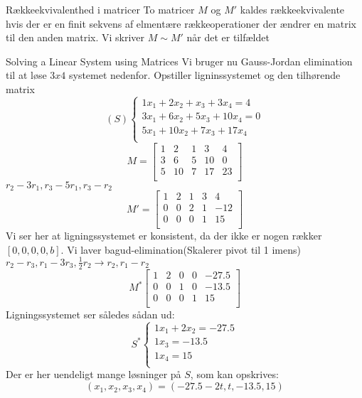 \documentclass[a4paper,fleqn]{article}
\begin{document}
	\begin{definition}{Rækkeekvivalenthed i matricer}{}
		To matricer $M$ og $M'$ kaldes rækkeekvivalente hvis der er en finit sekvens af
		elmentære rækkeoperationer der ændrer en matrix til den anden matrix. Vi skriver
		$M \sim M'$ når det er tilfældet
	\end{definition}
	\begin{example}{Solving a Linear System using Matrices}{}
		Vi bruger nu Gauss-Jordan elimination til at løse $3x4$ systemet nedenfor.
		Opstiller ligninssystemet og den tilhørende matrix\\
		\[
			(S)\left\{\begin{array}{c}
					1x_1+2x_2+x_3+3x_4=4\\
					3x_1+6x_2+5x_3+10x_4=0\\
					5x_1+10x_2+7x_3+17x_4\\
			\end{array}\right.
		\]\[
			M = \begin{bmatrix}
				1&2&1&3& 4\\
				3&6&5&10&0\\
				5&10&7&17&23\\
	\end{bmatrix}\]$r_2-3r_1,r_3-5r_1, r_3-r_2$ \[
	M' = \begin{bmatrix}
		1&2&1&3&4\\
		0&0&2&1&-12\\
		0&0&0&1&15\\
	\end{bmatrix}\]
	Vi ser her at ligningssystemet er konsistent, da der ikke er nogen rækker 
	$[ 0, 0, 0, 0, b ]$. Vi laver bagud-elimination(Skalerer pivot til 1 imens)\\
	$ r_2 - r_3, r_1 - 3r_3, \frac{1}{2}r_2 \rightarrow r_2, r_1 - r_2$
	\[ M^* \begin{bmatrix}
			1&2&0&0&-27.5\\
			0&0&1&0&-13.5\\
			0&0&0&1&15\\
	\end{bmatrix}\]
	Ligningssystemet ser således sådan ud:
	\[
		S^* \left\{\begin{array}{c}
				1x_1 + 2x_2 = -27.5\\
				1x_3 = -13.5\\
				1x_4 = 15\\
		\end{array}\right.
	\]
	Der er her uendeligt mange løsninger på $S$, som kan opskrives:
	\[(x_1, x_2, x_3, x_4) = (-27.5-2t, t, -13.5, 15)\]
	\end{example}
\end{document}
